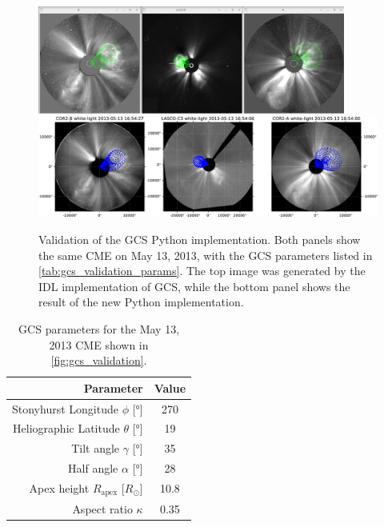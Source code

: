 \begin{figure}
	\centering
	\includegraphics[width=0.9\textwidth]{images/gcs_validation_20130513_idl.png}\\[5mm]
	\includegraphics[width=\textwidth]{images/gcs_validation_20130513_python.pdf}
	\caption[Validation of the \acs{GCS} Python implementation]{Validation of the \ac{GCS} Python implementation. Both panels show the same \ac{CME} on May 13, 2013, with the \ac{GCS} parameters listed in \autoref{tab:gcs_validation_params}. The top image was generated by the \ac{IDL} implementation of \ac{GCS}, while the bottom panel shows the result of the new Python implementation.}
	\label{fig:gcs_validation}
\end{figure}

\begin{table}
	\centering
	\begin{tabular}{rS[table-format=3.2]}
		\toprule
		                                  {Parameter} & {Value} \\ \midrule
		   Stonyhurst Longitude $\phi$ [\si{\degree}] & 270     \\
		Heliographic Latitude $\theta$ [\si{\degree}] & 19      \\
		           Tilt angle $\gamma$ [\si{\degree}] & 35      \\
		           Half angle $\alpha$ [\si{\degree}] & 28      \\
		      Apex height $R_\text{apex}$ [$R_\odot$] & 10.8    \\
		                        Aspect ratio $\kappa$ & 0.35    \\ \bottomrule
	\end{tabular}
	\caption[\acs{GCS} parameters for \autoref{fig:gcs_validation}]{\ac{GCS} parameters for the May 13, 2013 \ac{CME} shown in \autoref{fig:gcs_validation}.}
	\label{tab:gcs_validation_params}
\end{table}

